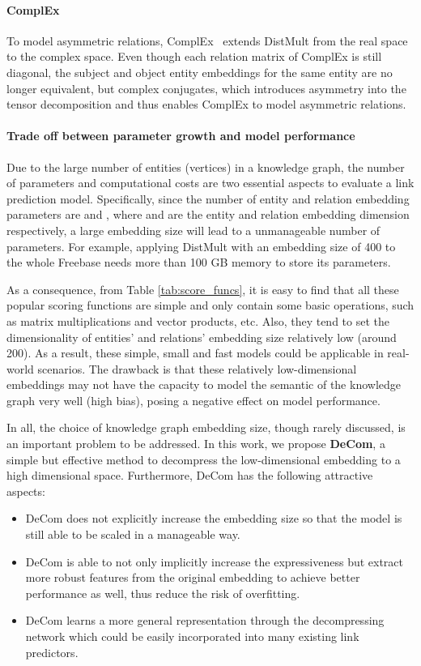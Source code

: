 \documentclass[letterpaper]{article} \usepackage{aaai20}  \usepackage{times}  \usepackage{helvet} \usepackage{courier}  \usepackage{booktabs}
\begin{document}
\paragraph{ComplEx} To model asymmetric relations, ComplEx~\cite{trouillon2016complex} extends DistMult from the real space to the complex space. Even though each relation
matrix of ComplEx is still diagonal, the subject and object entity embeddings for the same entity are no longer equivalent, but complex conjugates, which introduces asymmetry into the tensor decomposition and thus enables ComplEx to model asymmetric relations.

\paragraph{Trade off between parameter growth and model performance}
Due to the large number of entities (vertices) in a knowledge graph, the number of parameters and computational costs are two essential aspects to evaluate a link prediction model. Specifically, since the number of entity and relation embedding parameters are  and , where  and  are the entity and relation embedding dimension respectively, a large embedding size will lead to a unmanageable number of parameters. For example, applying DistMult with an embedding size of 400 to the whole Freebase needs more than 100 GB memory to store its parameters.

As a consequence, from Table \ref{tab:score_funcs}, it is easy to find that all these popular scoring functions are simple and only contain some basic operations, such as matrix multiplications and vector products, etc. Also, they tend to set the dimensionality of entities' and relations' embedding size relatively low (around 200). As a result, these simple, small and fast models could be applicable in real-world scenarios. 
The drawback is that these relatively low-dimensional embeddings may not have the capacity to model the semantic of the knowledge graph very well (high bias), posing a negative effect on model performance.

In all, the choice of knowledge graph embedding size, though rarely discussed, is an important problem to be addressed.
In this work, we propose \textbf{DeCom}, a simple but effective method to decompress the low-dimensional embedding to a high dimensional space. Furthermore, DeCom has the following attractive aspects:
\begin{itemize}
    \item DeCom does not explicitly increase the embedding size so that the model is still able to be scaled in a manageable way.
    \item DeCom is able to not only implicitly increase the expressiveness but extract more robust features from the original embedding to achieve better performance as well, thus reduce the risk of overfitting.
    \item DeCom learns a more general representation through the decompressing network which could be easily incorporated into many existing link predictors.
\end{itemize}
\end{document}
